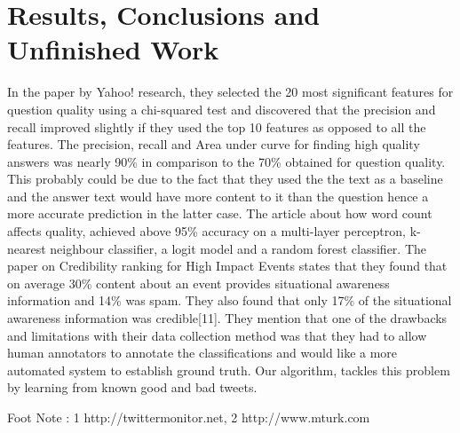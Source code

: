 \section{Results, Conclusions and Unfinished Work}
In the paper by Yahoo! research, they selected the 20 most significant features for question quality using a chi-squared test and discovered that the precision and recall improved slightly if they used the top 10 features as opposed to all the features. The precision, recall and Area under curve for finding high quality answers was nearly 90\% in comparison to the 70\% obtained for question quality. This probably could be due to the fact that they used the the text as a baseline and the answer text would have more content to it than the question hence a more accurate prediction in the latter case. The article about how word count affects quality, achieved above 95\% accuracy on a multi-layer perceptron, k-nearest neighbour classifier, a logit model and a random forest classifier. The paper on Credibility ranking for High Impact Events states that they found that on average 30\% content about an event provides situational awareness information and 14\% was spam. They also found that only 17\% of the situational awareness information was credible[11]. They mention that one of the drawbacks and limitations with their data collection method was that they had to allow human annotators to annotate the classifications and would like a more automated system to establish ground truth. Our algorithm, tackles this problem by learning from known good and bad tweets. 









Foot Note : 1 http://twittermonitor.net, 2 http://www.mturk.com